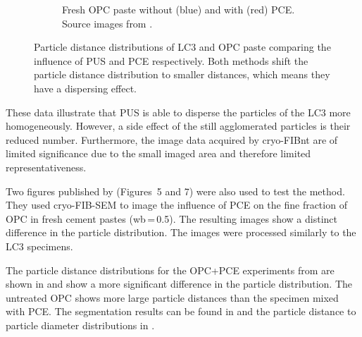 \begin{figure}[H]
\begin{subfigure}[t]{0.495\textwidth}
		\caption{
            Fresh \ac{OPC} paste without ({\color{blue}blue}) and with ({\color{red}red}) \acs*{PCE}.
		    Source images from \cite{zingg.2008a}.
        }
		\label{fig:cryo-fib-results_2b}
	\end{subfigure}

    \caption{
		Particle distance distributions of \acs*{LC3} and \acs*{OPC} paste comparing the influence of \acs*{PUS} and \acs*{PCE} respectively.
		Both methods shift the particle distance distribution to smaller distances, which means they have a dispersing effect.
    }
    \label{fig:cryo-fib-results_2}
\end{figure}

These data illustrate that \ac{PUS} is able to disperse the particles of the \ac{LC3} more homogeneously.
However, a side effect of the still agglomerated particles is their reduced number.
Furthermore, the image data acquired by cryo-\ac{FIBnt} are of limited significance due to the small imaged area and therefore limited representativeness.

Two figures published by \textcite{zingg.2008a} (Figures~\num{5} and \num{7}) were also used to test the method.
They used cryo-\ac{FIB}-\ac{SEM} to image the influence of \ac{PCE} on the fine fraction of \ac{OPC} in fresh cement pastes (\ac{wb}\,=\,\num{0.5}).
The resulting images show a distinct difference in the particle distribution.
The images were processed similarly to the \ac{LC3} specimens.

The particle distance distributions for the \ac{OPC}+\ac{PCE} experiments from \textcite{zingg.2008a} are shown in  and show a more significant difference in the particle distribution.
The untreated \ac{OPC} shows more large particle distances than the specimen mixed with \ac{PCE}.
The segmentation results can be found in  and the particle distance to particle diameter distributions in .

